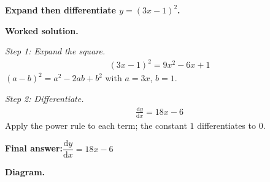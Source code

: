 \documentclass[11pt]{article}
\newcommand{\question}[1]{\par\medskip\noindent\textbf{#1}\par}
\begin{document}
\question{Expand then differentiate \( y = (3x - 1)^2 \).}

\textbf{Worked solution.}

\textit{Step 1: Expand the square.}
\[\begin{gathered}
(3x-1)^2 = 9x^2 - 6x + 1
\end{gathered}\]
\( (a - b)^2 = a^2 - 2ab + b^2 \) with \( a = 3x \), \( b = 1 \).

\textit{Step 2: Differentiate.}
\[\begin{gathered}
\frac{\mathrm{d}y}{\mathrm{d}x} = 18x - 6
\end{gathered}\]
Apply the power rule to each term; the constant \(1\) differentiates to \(0\).

\begin{answerbox}
\textbf{Final answer:}\quad \(\displaystyle  \dfrac{\mathrm{d}y}{\mathrm{d}x} = 18x - 6 \)
\end{answerbox}
\textbf{Diagram.}
\end{document}
